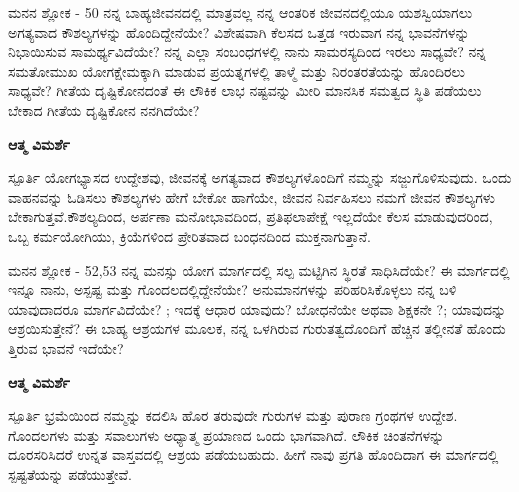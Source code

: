 \newpage
\begin{mananam}{\mananamfont ಮನನ ಶ್ಲೋಕ - \textenglish{50}}
\footnotesize \mananamtext ನನ್ನ ಬಾಹ್ಯಜೀವನದಲ್ಲಿ ಮಾತ್ರವಲ್ಲ ನನ್ನ ಆಂತರಿಕ ಜೀವನದಲ್ಲಿಯೂ ಯಶಸ್ವಿಯಾಗಲು ಅಗತ್ಯವಾದ ಕೌಶಲ್ಯಗಳನ್ನು ಹೊಂದಿದ್ದೇನೆಯೇ? ವಿಶೇಷವಾಗಿ ಕೆಲಸದ ಒತ್ತಡ ಇರುವಾಗ ನನ್ನ ಭಾವನೆಗಳನ್ನು ನಿಭಾಯಿಸುವ ಸಾಮರ್ಥ್ಯವಿದೆಯೇ? ನನ್ನ ಎಲ್ಲಾ ಸಂಬಂಧಗಳಲ್ಲಿ ನಾನು  ಸಾಮರಸ್ಯದಿಂದ ಇರಲು ಸಾಧ್ಯವೇ? ನನ್ನ ಸಮತೋಮುಖ ಯೋಗಕ್ಷೇಮಕ್ಕಾಗಿ ಮಾಡುವ ಪ್ರಯತ್ನಗಳಲ್ಲಿ ತಾಳ್ಮೆ ಮತ್ತು ನಿರಂತರತೆಯನ್ನು ಹೊಂದಿರಲು ಸಾಧ್ಯವೇ? ಗೀತೆಯ ದೃಷ್ಟಿಕೋನದಂತೆ ಈ ಲೌಕಿಕ ಲಾಭ ನಷ್ಟವನ್ನು ಮೀರಿ ಮಾನಸಿಕ ಸಮತ್ವದ ಸ್ಥಿತಿ ಪಡೆಯಲು ಬೇಕಾದ ಗೀತೆಯ ದೃಷ್ಟಿಕೋನ ನನಗಿದೆಯೇ?
\end{mananam}
\WritingHand\enspace\textbf{ಆತ್ಮ ವಿಮರ್ಶೆ}
\begin{inspiration}{\mananamfont ಸ್ಪೂರ್ತಿ}
\footnotesize \mananamtext ಯೋಗಭ್ಯಾಸದ ಉದ್ದೇಶವು, ಜೀವನಕ್ಕೆ ಅಗತ್ಯವಾದ ಕೌಶಲ್ಯಗಳೊಂದಿಗೆ ನಮ್ಮನ್ನು ಸಜ್ಜುಗೊಳಿಸುವುದು. ಒಂದು ವಾಹನವನ್ನು ಓಡಿಸಲು ಕೌಶಲ್ಯಗಳು ಹೇಗೆ ಬೇಕೋ ಹಾಗೆಯೇ, ಜೀವನ ನಿರ್ವಹಿಸಲು ನಮಗೆ ಜೀವನ ಕೌಶಲ್ಯಗಳು ಬೇಕಾಗುತ್ತವೆ.ಕೌಶಲ್ಯದಿಂದ, ಅರ್ಪಣಾ ಮನೋಭಾವದಿಂದ, ಪ್ರತಿಫಲಾಪೇಕ್ಷೆ ಇಲ್ಲದೆಯೇ ಕೆಲಸ ಮಾಡುವುದರಿಂದ, ಒಬ್ಬ ಕರ್ಮಯೋಗಿಯು, ಕ್ರಿಯೆಗಳಿಂದ ಪ್ರೇರಿತವಾದ ಬಂಧನದಿಂದ ಮುಕ್ತನಾಗುತ್ತಾನೆ.
\end{inspiration}
\newpage



\newpage
\begin{mananam}{\mananamfont ಮನನ ಶ್ಲೋಕ - \textenglish{52,53}}
\footnotesize \mananamtext ನನ್ನ ಮನಸ್ಸು ಯೋಗ ಮಾರ್ಗದಲ್ಲಿ ಸಲ್ಪ ಮಟ್ಟಿಗಿನ ಸ್ಥಿರತೆ ಸಾಧಿಸಿದೆಯೇ? ಈ ಮಾರ್ಗದಲ್ಲಿ ಇನ್ನೂ ನಾನು, ಅಸ್ಪಷ್ಟ  ಮತ್ತು ಗೊಂದಲದಲ್ಲಿದ್ದೇನೆಯೇ? ಅನುಮಾನಗಳನ್ನು ಪರಿಹರಿಸಿಕೊಳ್ಳಲು ನನ್ನ ಬಳಿ ಯಾವುದಾದರೂ ಮಾರ್ಗವಿದೆಯೇ? ; ಇದಕ್ಕೆ ಆಧಾರ ಯಾವುದು? ಬೋಧನೆಯೇ ಅಥವಾ ಶಿಕ್ಷಕನೇ ?; ಯಾವುದನ್ನು ಆಶ್ರಯಿಸುತ್ತೇನೆ? ಈ ಬಾಹ್ಯ ಆಶ್ರಯಗಳ ಮೂಲಕ, ನನ್ನ ಒಳಗಿರುವ ಗುರುತತ್ವದೊಂದಿಗೆ ಹೆಚ್ಚಿನ ತಲ್ಲೀನತೆ ಹೊಂದು ತ್ತಿರುವ ಭಾವನೆ ಇದೆಯೇ?
\end{mananam}
\WritingHand\enspace\textbf{ಆತ್ಮ ವಿಮರ್ಶೆ}
\begin{inspiration}{\mananamfont ಸ್ಪೂರ್ತಿ}
\footnotesize \mananamtext ಭ್ರಮೆಯಿಂದ ನಮ್ಮನ್ನು ಕದಲಿಸಿ ಹೊರ ತರುವುದೇ ಗುರುಗಳ ಮತ್ತು ಪುರಾಣ ಗ್ರಂಥಗಳ ಉದ್ದೇಶ. ಗೊಂದಲಗಳು ಮತ್ತು ಸವಾಲುಗಳು ಅಧ್ಯಾತ್ಮ ಪ್ರಯಾಣದ ಒಂದು ಭಾಗವಾಗಿದೆ. ಲೌಕಿಕ ಚಿಂತನೆಗಳನ್ನು ದೂರಸರಿಸಿದರೆ ಉನ್ನತ ವಾಸ್ತವದಲ್ಲಿ ಆಶ್ರಯ ಪಡೆಯಬಹುದು. ಹೀಗೆ ನಾವು ಪ್ರಗತಿ ಹೊಂದಿದಾಗ ಈ ಮಾರ್ಗದಲ್ಲಿ ಸ್ಪಷ್ಟತೆಯನ್ನು ಪಡೆಯುತ್ತೇವೆ.
\end{inspiration}
\newpage


